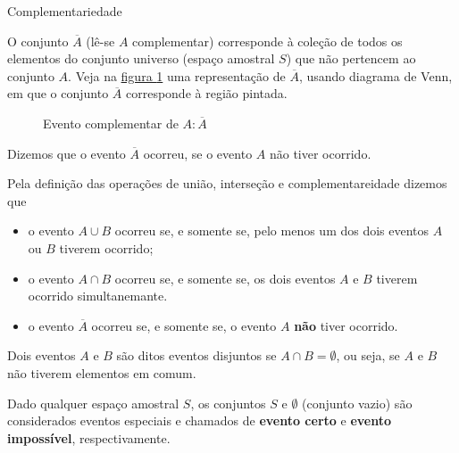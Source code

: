 \begin{observationtitle}{Complementariedade}

O conjunto \(\overline{A}\) (lê-se \(A\) complementar) corresponde à coleção de todos os elementos do conjunto universo (espaço amostral \(S\)) que não pertencem ao conjunto \(A\). Veja na \hyperref[complementar]{figura \ref{complementar}} uma representação de \(\overline{A}\), usando diagrama de Venn, em que o conjunto \(\overline{A}\) corresponde à região pintada.

\begin{figure}[H]
\centering

\caption{Evento complementar de \(A: \overline{A}\)}
\label{complementar}
\end{figure}

Dizemos que o evento \(\overline{A}\) ocorreu, se o evento \(A\) não tiver ocorrido.
\end{observationtitle}

Pela definição das operações de união, interseção e complementareidade dizemos que
\begin{itemize}
\item {} 
o evento \(A\cup B\)  ocorreu se, e somente se, pelo menos um dos dois eventos \(A\) ou \(B\) tiverem ocorrido;

\item {} 
o evento \(A\cap B\) ocorreu se, e somente se, os dois eventos \(A\) e \(B\) tiverem ocorrido simultanemante.

\item {} 
o evento \(\overline{A}\) ocorreu se, e somente se, o evento \(A\) \textbf{não} tiver ocorrido.

\end{itemize}

\begin{observation}{}
Dois eventos \(A\)  e \(B\) são ditos eventos disjuntos se $A\cap B=\emptyset$, ou seja, se \(A\) e \(B\) não tiverem elementos em comum.
\end{observation}

Dado qualquer espaço amostral \(S\), os conjuntos \(S\) e \(\emptyset\) (conjunto vazio) são considerados eventos especiais e chamados de \textbf{evento certo} e \textbf{evento impossível}, respectivamente.

